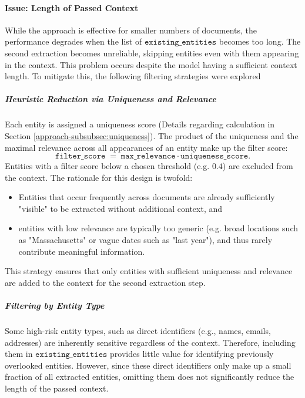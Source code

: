 \paragraph{Issue: Length of Passed Context}
While the approach is effective for smaller numbers of documents, the performance degrades when the list of $\texttt{existing\_entities}$ becomes too long. The second extraction becomes unreliable, skipping entities even with them appearing in the context. This problem occurs despite the model having a sufficient context length. To mitigate this, the following filtering strategies were explored %

\subparagraph{Heuristic Reduction via Uniqueness and Relevance}
Each entity is assigned a uniqueness score (Details regarding calculation in Section \ref{approach-subsubsec:uniqueness}). The product of the uniqueness and the maximal relevance across all appearances of an entity make up the filter score:
\[
    \texttt{filter\_score} \;=\; \texttt{max\_relevance} \cdot \texttt{uniqueness\_score}.
\]
Entities with a filter score below a chosen threshold (e.g. $0.4$) are excluded from the context. The rationale for this design is twofold:
\begin{itemize}
    \item Entities that occur frequently across documents are already sufficiently "visible" to be extracted without additional context, and
    \item entities with low relevance are typically too generic (e.g. broad locations such as "Massachusetts" or vague dates such as "last year"), and thus rarely contribute meaningful information.
\end{itemize}
This strategy ensures that only entities with sufficient uniqueness and relevance are added to the context for the second extraction step. %


\subparagraph{Filtering by Entity Type}\label{approach-subpar:type_filtering}
Some high-risk entity types, such as direct identifiers (e.g., names, emails, addresses) are inherently sensitive regardless of the context. Therefore, including them in $\texttt{existing\_entities}$ provides little value for identifying previously overlooked entities. However, since these direct identifiers only make up a small fraction of all extracted entities, omitting them does not significantly reduce the length of the passed context.

